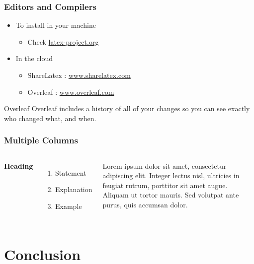 \documentclass[aspectratio=169]{beamer}
\begin{document}
\begin{frame}
\frametitle{Editors and Compilers}
\begin{itemize}
	\item To install in your machine
	\begin{itemize}
		\item Check \url{latex-project.org}
	\end{itemize}
	\item In the cloud
	\begin{itemize}
		\item ShareLatex : \url{www.sharelatex.com}
		\item Overleaf : \url{www.overleaf.com}
	\end{itemize}
\end{itemize}
\vskip 1cm
\begin{block}{Overleaf}
    Overleaf includes a history of all of your changes so you can see exactly who changed what, and when. 
\end{block}
\end{frame}


\begin{frame}
\frametitle{Multiple Columns}
\begin{columns}[c]
\textbf{Heading}
\begin{enumerate}
	\item Statement
	\item Explanation
	\item Example
\end{enumerate}
Lorem ipsum dolor sit amet, consectetur adipiscing elit. Integer lectus nisl, ultricies in feugiat rutrum, porttitor sit amet augue. Aliquam ut tortor mauris. Sed volutpat ante purus, quis accumsan dolor.
\end{columns}
\end{frame}



\section{Conclusion}
\end{document}
